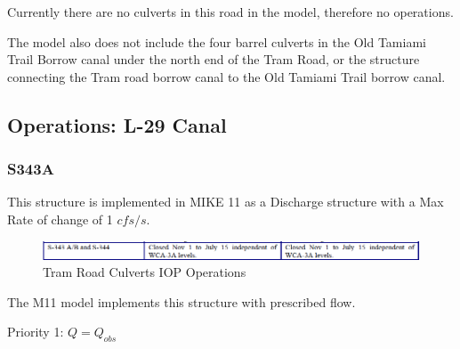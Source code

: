 Currently there are no culverts in this road in the model, therefore no operations.

The model also does not include the four barrel culverts in the Old Tamiami Trail Borrow canal under the north end of the Tram Road, or the structure connecting the Tram road borrow canal to the Old Tamiami Trail borrow canal.

\clearpage
\subsection{Operations: L-29 Canal}

\subsubsection{S343A}

This structure is implemented in MIKE 11 as a Discharge structure with a Max Rate of change of 1 $cfs/s$.

\begin{figure}[!h]
  \begin{center}
  \includegraphics[width=6.5in]{../figs/S343-S344_IOPops.png}
  \caption{Tram Road Culverts IOP Operations}
  \label{fig:343iop}
  \end{center}
\end{figure}

The M11 model implements this structure with prescribed flow.

\begin{packed_items}
\item Priority 1: $Q = Q_{obs}$
\end{packed_items}

